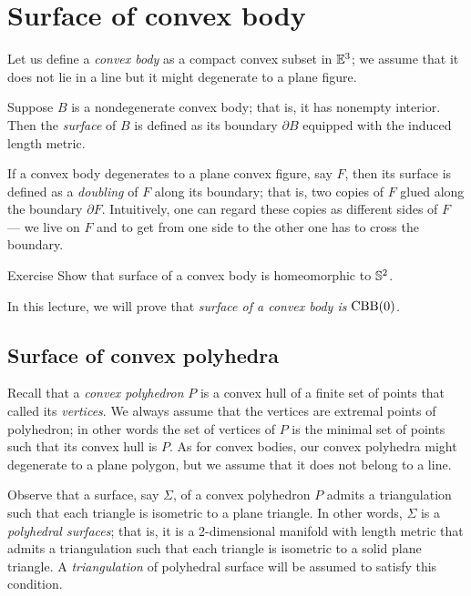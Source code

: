 \chapter{Surface of convex body}\label{chap:convex-body}

Let us define a \emph{convex body} as a compact convex subset in $\mathbb{E}^3$;
we assume that it does not lie in a line but it might degenerate to a plane figure.

Suppose $B$ is a nondegenerate convex body; that is, it has nonempty interior.
Then the \emph{surface} of $B$ is defined as its boundary $\partial B$ equipped with the induced length metric.

If a convex body degenerates to a plane convex figure, say $F$, then its surface is defined as a \emph{doubling} of $F$ along its boundary;
that is, two copies of $F$ glued along the boundary $\partial F$.
Intuitively, one can regard these copies as different sides of $F$ --- we live on $F$ and to get from one side to the other one has to cross the boundary.

\begin{thm}{Exercise}\label{ex:surf-S2}
Show that surface of a convex body is homeomorphic to $\mathbb{S}^2$.
\end{thm}

In this lecture, we will prove that \textit{surface of a convex body is $\mathrm{CBB}(0)$.}



\section{Surface of convex polyhedra}

Recall that a \emph{convex polyhedron} $P$ is a convex hull of a finite set of points
that called its \emph{vertices}.
We always assume that the vertices are extremal points of polyhedron;
in other words the set of vertices of $P$ is the minimal set of points such that its convex hull is $P$.
As for convex bodies, our convex polyhedra might degenerate to a plane polygon, but we assume that it does not belong to a line.

Observe that a surface, say $\Sigma$, of a convex polyhedron $P$ admits a triangulation such that each triangle is isometric to a plane triangle.
In other words, $\Sigma$ is a \emph{polyhedral surfaces};
that is, it is a 2-dimensional manifold with length metric that admits a triangulation such that each triangle is isometric to a solid plane triangle.
A \emph{triangulation} of polyhedral surface will be assumed to satisfy this condition.


